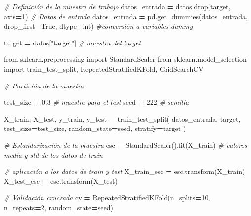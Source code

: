 \documentclass[
  a4paper,
  DIV=11,
  numbers=noendperiod]{scrreprt}
\newenvironment{Shaded}{\begin{snugshade}}{\end{snugshade}}
\newcommand{\BuiltInTok}[1]{#1}
\newcommand{\CommentTok}[1]{\textcolor[rgb]{0.56,0.35,0.01}{\textit{#1}}}
\newcommand{\DecValTok}[1]{\textcolor[rgb]{0.00,0.00,0.81}{#1}}
\newcommand{\FloatTok}[1]{\textcolor[rgb]{0.00,0.00,0.81}{#1}}
\newcommand{\ImportTok}[1]{#1}
\newcommand{\NormalTok}[1]{#1}
\newcommand{\OperatorTok}[1]{\textcolor[rgb]{0.81,0.36,0.00}{\textbf{#1}}}
\newcommand{\StringTok}[1]{\textcolor[rgb]{0.31,0.60,0.02}{#1}}
\newcommand{\VariableTok}[1]{\textcolor[rgb]{0.00,0.00,0.00}{#1}}
\begin{document}
\begin{Shaded}
\begin{Highlighting}[numbers=left,,]
\CommentTok{\# Definición de la muestra de trabajo}
\NormalTok{datos\_entrada }\OperatorTok{=}\NormalTok{ datos.drop(}\StringTok{\textquotesingle{}target\textquotesingle{}}\NormalTok{, axis}\OperatorTok{=}\DecValTok{1}\NormalTok{) }\CommentTok{\# Datos de entrada}
\NormalTok{datos\_entrada }\OperatorTok{=}\NormalTok{ pd.get\_dummies(datos\_entrada, drop\_first}\OperatorTok{=}\VariableTok{True}\NormalTok{, dtype}\OperatorTok{=}\BuiltInTok{int}\NormalTok{) }\CommentTok{\#conversión a variables dummy}

\NormalTok{target }\OperatorTok{=}\NormalTok{ datos[}\StringTok{"target"}\NormalTok{] }\CommentTok{\# muestra del target}
\end{Highlighting}
\end{Shaded}

\begin{Shaded}
\begin{Highlighting}[numbers=left,,]
\ImportTok{from}\NormalTok{ sklearn.preprocessing }\ImportTok{import}\NormalTok{ StandardScaler}
\ImportTok{from}\NormalTok{ sklearn.model\_selection }\ImportTok{import}\NormalTok{ train\_test\_split, RepeatedStratifiedKFold, GridSearchCV}

\CommentTok{\# Partición de la muestra}

\NormalTok{test\_size }\OperatorTok{=} \FloatTok{0.3} \CommentTok{\# muestra para el test }
\NormalTok{seed }\OperatorTok{=} \DecValTok{222} \CommentTok{\# semilla}

\NormalTok{X\_train, X\_test, y\_train, y\_test }\OperatorTok{=}\NormalTok{ train\_test\_split(}
\NormalTok{    datos\_entrada, target, test\_size}\OperatorTok{=}\NormalTok{test\_size, random\_state}\OperatorTok{=}\NormalTok{seed, stratify}\OperatorTok{=}\NormalTok{target}
\NormalTok{)}

\CommentTok{\# Estandarización de la muestra}
\NormalTok{esc }\OperatorTok{=}\NormalTok{ StandardScaler().fit(X\_train) }\CommentTok{\# valores media y std de los datos de train}

\CommentTok{\# aplicación a los datos de train y test}
\NormalTok{X\_train\_esc }\OperatorTok{=}\NormalTok{ esc.transform(X\_train)}
\NormalTok{X\_test\_esc }\OperatorTok{=}\NormalTok{ esc.transform(X\_test)}

\CommentTok{\# Validación cruczada}
\NormalTok{cv }\OperatorTok{=}\NormalTok{ RepeatedStratifiedKFold(n\_splits}\OperatorTok{=}\DecValTok{10}\NormalTok{, n\_repeats}\OperatorTok{=}\DecValTok{2}\NormalTok{, random\_state}\OperatorTok{=}\NormalTok{seed)}
\end{Highlighting}
\end{Shaded}
\end{document}
